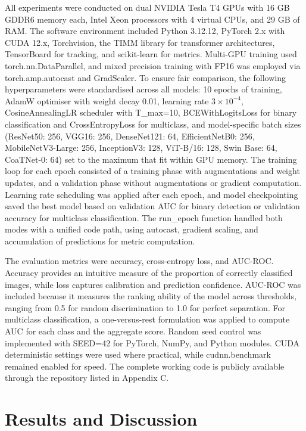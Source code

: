 \documentclass[final,3p,times,number]{elsarticle}
\begin{document}
All experiments were conducted on dual NVIDIA Tesla T4 GPUs with 16 GB GDDR6 memory each, Intel Xeon processors with 4 virtual CPUs, and 29 GB of RAM. The software environment included Python 3.12.12, PyTorch 2.x with CUDA 12.x, Torchvision, the TIMM library for transformer architectures, TensorBoard for tracking, and scikit-learn for metrics. Multi-GPU training used torch.nn.DataParallel, and mixed precision training with FP16 was employed via torch.amp.autocast and GradScaler. To ensure fair comparison, the following hyperparameters were standardised across all models: 10 epochs of training, AdamW optimiser with weight decay 0.01, learning rate $3 \times 10^{-4}$, CosineAnnealingLR scheduler with T\_max=10, BCEWithLogitsLoss for binary classification and CrossEntropyLoss for multiclass, and model-specific batch sizes (ResNet50: 256, VGG16: 256, DenseNet121: 64, EfficientNetB0: 256, MobileNetV3-Large: 256, InceptionV3: 128, ViT-B/16: 128, Swin Base: 64, CoaTNet-0: 64) set to the maximum that fit within GPU memory. The training loop for each epoch consisted of a training phase with augmentations and weight updates, and a validation phase without augmentations or gradient computation. Learning rate scheduling was applied after each epoch, and model checkpointing saved the best model based on validation AUC for binary detection or validation accuracy for multiclass classification. The run\_epoch function handled both modes with a unified code path, using autocast, gradient scaling, and accumulation of predictions for metric computation.

The evaluation metrics were accuracy, cross-entropy loss, and AUC-ROC. Accuracy provides an intuitive measure of the proportion of correctly classified images, while loss captures calibration and prediction confidence. AUC-ROC was included because it measures the ranking ability of the model across thresholds, ranging from 0.5 for random discrimination to 1.0 for perfect separation. For multiclass classification, a one-versus-rest formulation was applied to compute AUC for each class and the aggregate score. Random seed control was implemented with SEED=42 for PyTorch, NumPy, and Python modules. CUDA deterministic settings were used where practical, while cudnn.benchmark remained enabled for speed. The complete working code is publicly available through the repository listed in Appendix C.

\section{Results and Discussion}
\end{document}
